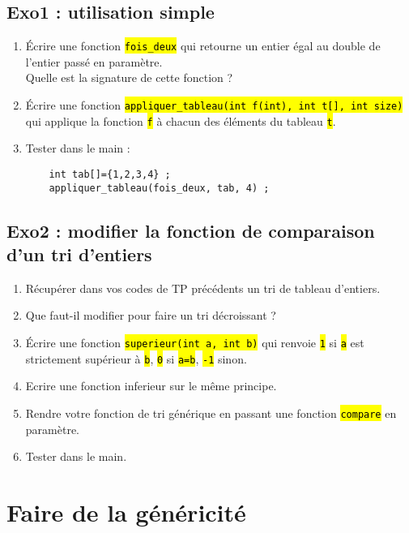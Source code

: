 \documentclass[final, pdftex, a4paper, openbib, ]{article}
\let\OldTexttt\texttt
\renewcommand{\texttt}[1]{\OldTexttt{\hl{#1}}}
\begin{document}
\subsection{Exo1 : utilisation simple}
\begin{enumerate}
	\item Écrire une fonction \texttt{fois\_deux} qui retourne un entier égal au double de l'entier passé en paramètre.\\
	Quelle est la signature de cette fonction ?
	\item Écrire une fonction \texttt{appliquer\_tableau(int f(int), int t[], int size)} qui applique la fonction \texttt{f} à chacun des éléments du tableau \texttt{t}.
	
	
	\item Tester dans le main :
	\begin{verbatim}
	int tab[]={1,2,3,4} ;
	appliquer_tableau(fois_deux, tab, 4) ;
	\end{verbatim}	
\end{enumerate}


\subsection{Exo2 : modifier la fonction de comparaison d'un tri d'entiers}
\begin{enumerate}
	\item Récupérer dans vos codes de TP précédents un tri de tableau d'entiers.
	\item Que faut-il modifier pour faire un tri décroissant ?
	\item Écrire une fonction \texttt{superieur(int a, int b)} qui renvoie \texttt{1} si \texttt{a} est strictement supérieur à \texttt{b}, \texttt{0} si \texttt{a=b}, \texttt{-1}	sinon.
	\item Ecrire une fonction inferieur sur le même principe.
	\item Rendre votre fonction de tri générique en passant une fonction \texttt{compare} en paramètre.
	\item Tester dans le main.
\end{enumerate}


\section{Faire de la généricité}
\end{document}
